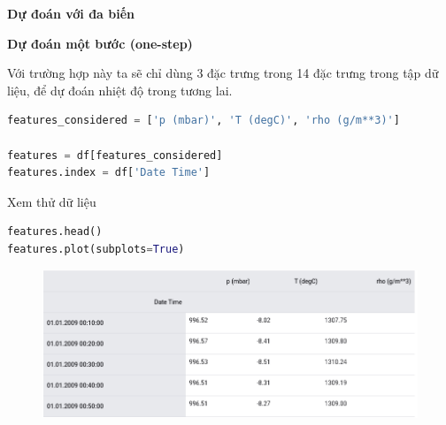 \vspace{5cm}
\changefontsizes{15pt}
\setlength{\parindent}{0cm}
\textbf{Dự đoán với đa biến}


\vspace{0.25cm}
\changefontsizes{14pt}
\setlength{\parindent}{0cm}
\textbf{Dự đoán một bước (one-step)}



\vspace{0.25cm}
\changefontsizes{13pt}
Với trường hợp này ta sẽ chỉ dùng 3 đặc trưng trong 14 đặc trưng trong tập dữ liệu, để dự đoán nhiệt độ trong tương lai.


\begin{lstlisting}[language=Python]
features_considered = ['p (mbar)', 'T (degC)', 'rho (g/m**3)']

features = df[features_considered]
features.index = df['Date Time']
\end{lstlisting}

Xem thử dữ liệu



\begin{lstlisting}[language=Python]
features.head()
features.plot(subplots=True)
\end{lstlisting}


\vspace{-0.75cm}
\begin{center}
	\begin{figure}[htp]
		\begin{center}
			\includegraphics[scale=0.5]{./images/6.png}
		\end{center}
	\end{figure}
\end{center}



